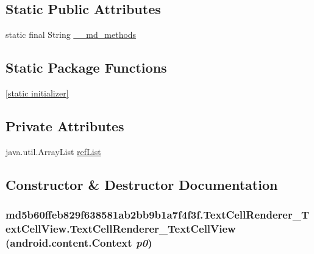 \subsection*{Static Public Attributes}
\begin{CompactItemize}
\item 
static final String \hyperlink{classmd5b60ffeb829f638581ab2bb9b1a7f4f3f_1_1_text_cell_renderer___text_cell_view_00b3617596bc3d87d289d2fa7895a853}{\_\-\_\-md\_\-methods}
\end{CompactItemize}
\subsection*{Static Package Functions}
\begin{CompactItemize}
\item 
\hyperlink{classmd5b60ffeb829f638581ab2bb9b1a7f4f3f_1_1_text_cell_renderer___text_cell_view_99fc1adaf6ba874322d45cb6ab9ce84c}{\mbox{[}static initializer\mbox{]}}
\end{CompactItemize}
\subsection*{Private Attributes}
\begin{CompactItemize}
\item 
java.util.ArrayList \hyperlink{classmd5b60ffeb829f638581ab2bb9b1a7f4f3f_1_1_text_cell_renderer___text_cell_view_f83f0ccc30bfc43d4b87f8e0bc0790c4}{refList}
\end{CompactItemize}


\subsection{Constructor \& Destructor Documentation}
\hypertarget{classmd5b60ffeb829f638581ab2bb9b1a7f4f3f_1_1_text_cell_renderer___text_cell_view_fe6c7e7e2a7fabcc9de2be5e1213ec39}{
\subsubsection[{TextCellRenderer\_\-TextCellView}]{\setlength{\rightskip}{0pt plus 5cm}md5b60ffeb829f638581ab2bb9b1a7f4f3f.TextCellRenderer\_\-TextCellView.TextCellRenderer\_\-TextCellView (android.content.Context {\em p0})}}
\label{classmd5b60ffeb829f638581ab2bb9b1a7f4f3f_1_1_text_cell_renderer___text_cell_view_fe6c7e7e2a7fabcc9de2be5e1213ec39}


